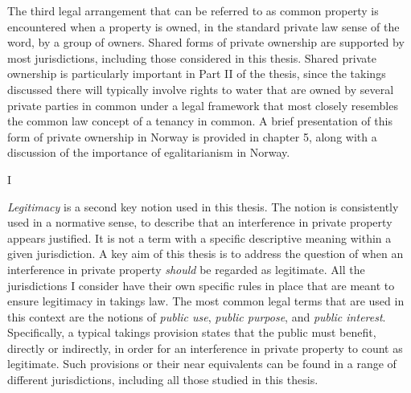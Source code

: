 {The third legal arrangement that can be referred to as common property is encountered when a property is owned, in the standard private law sense of the word, by a group of owners. Shared forms of private ownership are supported by most jurisdictions, including those considered in this thesis. Shared private ownership is particularly important in Part II of the thesis, since the takings discussed there will typically involve rights to water that are owned by several private parties in common under a legal framework that most closely resembles the common law concept of a tenancy in common. A brief presentation of this form of private ownership in Norway is provided in chapter 5, along with a discussion of the importance of egalitarianism in Norway.


I%

{\it Legitimacy} is a second key notion used in this thesis. The notion is consistently used in a normative sense, to describe that an interference in private property appears justified. It is not a term with a specific descriptive meaning within a given jurisdiction. A key aim of this thesis is to address the question of when an interference in private property {\it should} be regarded as legitimate. All the jurisdictions I consider have their own specific rules in place that are meant to ensure legitimacy in takings law. The most common legal terms that are used in this context are the notions of {\it public use}, {\it public purpose}, and {\it public interest}. Specifically, a typical takings provision states that the public must benefit, directly or indirectly, in order for an interference in private property to count as legitimate. Such provisions or their near equivalents can be found in a range of different jurisdictions, including all those studied in this thesis.

}
